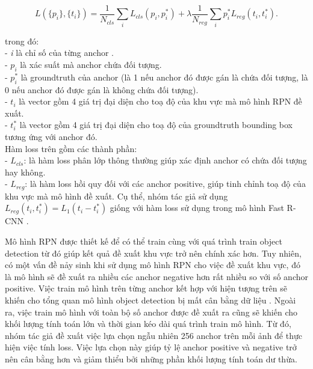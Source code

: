 {    \begin{equation}
        \label{eq:faster_rcnn_loss}
        L(\{p_i\}, \{t_i\}) = \frac{1}{N_{cls}}\sum_i L_{cls}(p_i, p^{*}_i) + \lambda\frac{1}{N_{reg}}\sum_i  p^{*}_i L_{reg}(t_i, t^{*}_i).
    \end{equation}

    \noindent
    trong đó: \\
    - \textit{i} là chỉ số của từng anchor . \\
    - \textit{$p_i$} là xác suất mà anchor  chứa đối tượng. \\
    - \textit{$p^{*}_i$} là groundtruth  của anchor  (là 1 nếu anchor  đó được gán là chứa đối tượng, là 0 nếu anchor  đó được gán là không chứa đối tượng). \\
    - \textit{$t_i$} là vector gồm 4 giá trị đại diện cho toạ độ của khu vực mà mô hình RPN đề xuất. \\
    - \textit{$t^{*}_i$} là vector gồm 4 giá trị đại diện cho toạ độ của groundtruth  bounding box  tương ứng với anchor  đó. \\
    Hàm loss trên gồm các thành phần: \\
    - \textit{$L_{cls}$}: là hàm loss phân lớp thông thường giúp xác định anchor  có chứa đối tượng hay không. \\
    - \textit{$L_{reg}$}: là hàm loss hồi quy đối với các anchor  positive, giúp tinh chỉnh toạ độ của khu vực mà mô hình đề xuất.
    Cụ thể, nhóm tác giả sử dụng $L_{reg}(t_i, t^{*}_i)=L_1(t_i - t^{*}_i)$ giống với hàm loss sử dụng trong mô hình Fast R-CNN \cite{girshick2015fast}.

    \noindent
    Mô hình RPN được thiết kế để có thể train cùng với quá trình train object detection từ đó giúp kết quả đề xuất khu vực trở nên chính xác hơn.
    Tuy nhiên, có một vấn đề nảy sinh khi sử dụng mô hình RPN cho việc đề xuất khu vực, đó là mô hình sẽ đề xuất ra nhiều các anchor  negative hơn rất nhiều so với số anchor  positive.
    Việc train mô hình trên từng anchor  kết hợp với hiện tượng trên sẽ khiến cho tổng quan mô hình object detection bị mất cân bằng dữ liệu .
    Ngoài ra, việc train mô hình với toàn bộ số anchor  được đề xuất ra cũng sẽ khiến cho khối lượng tính toán lớn và thời gian kéo dài quá trình train mô hình.
    Từ đó, nhóm tác giả đề xuất việc lựa chọn ngẫu nhiên 256 anchor  trên mỗi ảnh để thực hiện việc tính loss. Việc lựa chọn này giúp tỷ lệ anchor  positive và negative trở nên cân bằng hơn và giảm thiểu bởi những phần khối lượng tính toán dư thừa.

}
